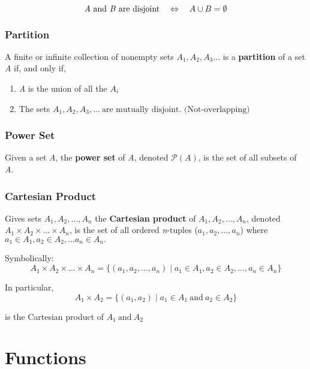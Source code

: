 \documentclass[12pt]{article}
\begin{document}
\begin{equation*}
\text{\textit{A} and \textit{B} are disjoint} \quad \Leftrightarrow \quad A \cup B = \emptyset
\end{equation*}

\subsubsection*{Partition}
A finite or infinite collection of nonempty sets ${A_1, A_2, A_3 \ldots}$ is a \textbf{partition} of a set \textit{A} if, and only if,

\begin{enumerate}
\item \textit{A} is the union of all the $A_i$
\item The sets $A_1, A_2, A_3, \ldots \ \text{are mutually disjoint. (Not-overlapping)}$
\end{enumerate}

\subsubsection*{Power Set}
Given a set \textit{A}, the \textbf{power set} of \textit{A}, denoted $\mathcal P(A)$, is the set of all subsets of \textit{A}.

\subsubsection*{Cartesian Product}
Gives sets $A_1, A_2, \ldots, A_n$ the \textbf{Cartesian product} of $A_1, A_2, \ldots, A_n$, denoted \textbf{$A_1 \times A_2 \times \ldots \times A_n$}, is the set of all ordered \textit{n}-tuples ($a_1, a_2, \ldots, a_n$) where $a_1 \in A_1, a_2 \in A_2, \ldots a_n \in A_n.$

Symbolically:
\begin{equation*}
A_1 \times A_2 \times \ldots \times A_n = \{ (a_1, a_2, \ldots, a_n) \mid a_1 \in A_1, a_2 \in A_2, \ldots, a_n \in A_n \}
\end{equation*}

In particular,
\begin{equation*}
A_1 \times A_2 = \{ (a_1, a_2) \mid a_1 \in A_1 \ \text{and} \ a_2 \in A_2 \}
\end{equation*}

is the Cartesian product of $A_1 \ \text{and} \ A_2$

\section{Functions}
\end{document}
